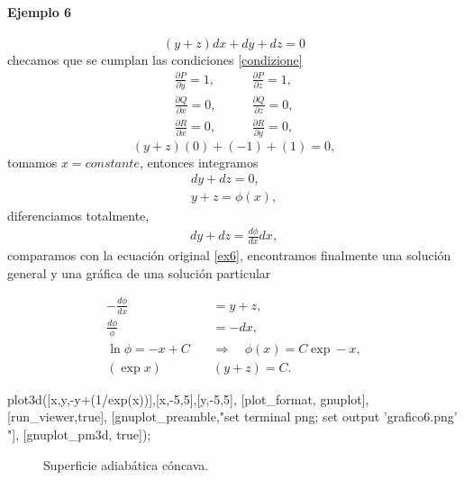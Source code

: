 \documentclass{article}
\theoremstyle{definition} \newtheorem{defi}{Definici\'on}
\theoremstyle{definition} \newtheorem{teo}{Teorema}
\theoremstyle{definition} \newtheorem{cor}{Corolario}
\begin{document}
\paragraph{Ejemplo 6}
\begin{equation}\label{ex6}
(y+z)dx+dy+dz=0
\end{equation}
checamos que se cumplan las condiciones \eqref{condizione}
\begin{align*}	
\frac{\partial P}{\partial y} = 1, & \qquad \frac{\partial P}{\partial z} = 1,\\
\frac{\partial Q}{\partial x} = 0, & \qquad \frac{\partial Q}{\partial z} = 0,\\
\frac{\partial R}{\partial x} = 0, & \qquad \frac{\partial R}{\partial y} = 0,
\end{align*}
$$(y+z)(0)+(-1)+(1)=0,$$
tomamos $x=constante$, entonces integramos
\begin{align*}
dy+dz = 0,\\
y+z = \phi(x),
\end{align*}
diferenciamos totalmente,
\begin{align*}
dy + dz = \frac{d\phi}{dx}dx,
\end{align*}
comparamos con la ecuaci\'on original \eqref{ex6}, encontramos finalmente una soluci\'on general y una gr\'afica de una soluci\'on particular

\begin{align*}
-\frac{d\phi}{dx} &= y+z,\\
\frac{d\phi}{\phi} &= -dx,\\
\ln \phi = -x+C \quad &\Rightarrow \quad \phi(x)=C\exp -x,\\
(\exp x)&(y+z)=C.
\end{align*}
\begin{maximacmd}
   plot3d([x,y,-y+(1/exp(x))],[x,-5,5],[y,-5,5],
    [plot_format, gnuplot],
    [run_viewer,true],
    [gnuplot_preamble,"set terminal png; set output 'grafico6.png' "],
    [gnuplot_pm3d, true]);
\end{maximacmd}
\begin{figure}
\caption{Superficie adiab\'atica c\'oncava.}
\end{figure}
\end{document}
